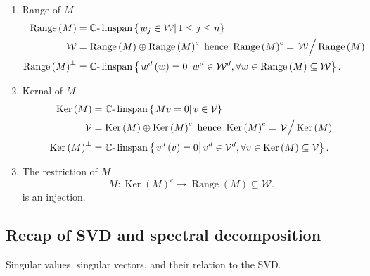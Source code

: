 \documentclass[aps,preprint]{revtex4}%
\begin{document}
\begin{enumerate}
\item Range of $M$%
\begin{align}
\operatorname*{Range}\left(  M\right)   &  =\mathbb{C}\text{-}%
\operatorname*{linspan}\left\{  \left.  w_{j}\in\mathcal{W}\right\vert 1\leq
j\leq n\right\} \\
\mathcal{W}  &  =\operatorname*{Range}\left(  M\right)  \oplus
\operatorname*{Range}\left(  M\right)  ^{c}\text{ hence }\operatorname*{Range}%
\left(  M\right)  ^{c}=\left.  \overset{}{\mathcal{W}}\right/
\operatorname*{Range}\left(  M\right) \\
\operatorname*{Range}\left(  M\right)  ^{\bot}  &  =\mathbb{C}\text{-}%
\operatorname*{linspan}\left\{  \left.  w^{d}\left(  w\right)  =0\right\vert
w^{d}\in\mathcal{W}^{d},\forall w\in\operatorname*{Range}\left(  M\right)
\subseteq\mathcal{W}\right\}  .
\end{align}


\item Kernal of $M$%
\begin{align}
\operatorname{Ker}\left(  M\right)   &  =\mathbb{C}\text{-}%
\operatorname*{linspan}\left\{  \left.  Mv=0\right\vert v\in\mathcal{V}%
\right\} \\
\mathcal{V}  &  =\operatorname{Ker}\left(  M\right)  \oplus\operatorname{Ker}%
\left(  M\right)  ^{c}\text{ hence }\operatorname{Ker}\left(  M\right)
^{c}=\left.  \overset{}{\mathcal{V}}\right/  \operatorname{Ker}\left(
M\right) \\
\operatorname{Ker}\left(  M\right)  ^{\bot}  &  =\mathbb{C}\text{-}%
\operatorname*{linspan}\left\{  \left.  v^{d}\left(  v\right)  =0\right\vert
v^{d}\in\mathcal{V}^{d},\forall v\in\operatorname{Ker}\left(  M\right)
\subseteq\mathcal{V}\right\}  .
\end{align}


\item The restriction of $M$
\begin{equation}
M:\operatorname{Ker}\left(  M\right)  ^{c}\rightarrow\operatorname*{Range}%
\left(  M\right)  \subseteq\mathcal{W}.
\end{equation}
is an injection.
\end{enumerate}

\subsection{Recap of SVD and spectral decomposition}

Singular values, singular vectors, and their relation to the SVD.
\end{document}
